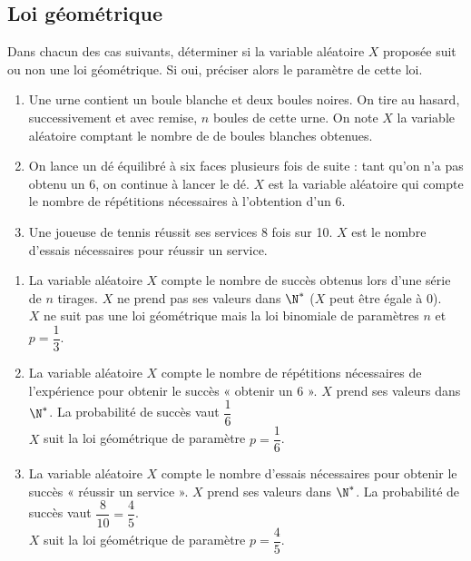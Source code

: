 \documentclass[a4paper,11pt,exos]{nsi} %
\begin{document}
\subsection*{Loi géométrique}

\exo{}%
\textcolor{UGLiBlue}{Dans chacun des cas suivants, déterminer si la variable aléatoire $X$ proposée suit ou non une loi géométrique. Si oui, préciser alors le paramètre de cette loi.
\begin{enumerate}
    \item Une urne contient un boule blanche et deux boules noires. On tire au hasard, successivement et avec remise, $n$ boules de cette urne. On note $X$ la variable aléatoire comptant le nombre de de boules blanches obtenues.
    \item On lance un dé équilibré à six faces plusieurs fois de suite : tant qu'on n'a pas obtenu un 6, on continue à lancer le dé. $X$ est la variable aléatoire qui compte le nombre de répétitions nécessaires à l'obtention d'un 6.
    \item Une joueuse de tennis réussit ses services 8 fois sur 10. $X$ est le nombre d'essais nécessaires pour réussir un service.
\end{enumerate}}

\begin{enumerate}
    \item La variable aléatoire $X$ compte le nombre de succès obtenus lors d'une série de $n$ tirages. $X$ ne prend pas ses valeurs dans $\N^*$ ($X$ peut être égale à 0).\\
    $X$ ne suit pas une loi géométrique mais la loi binomiale de paramètres $n$ et $p=\dfrac{1}{3}$.
    \item La variable aléatoire $X$ compte le nombre de répétitions nécessaires de l'expérience pour obtenir le succès « obtenir un 6 ». $X$ prend ses valeurs dans $\N^*$. La probabilité de succès vaut $\dfrac{1}{6}$\\
    $X$ suit la loi géométrique de paramètre $p=\dfrac{1}{6}$.
    \item La variable aléatoire $X$ compte le nombre d'essais nécessaires pour obtenir le succès « réussir un service ». $X$ prend ses valeurs dans $\N^*$. La probabilité de succès vaut $\dfrac{8}{10}=\dfrac{4}{5}$.\\
    $X$ suit la loi géométrique de paramètre $p=\dfrac{4}{5}$.
\end{enumerate}
\end{document}
